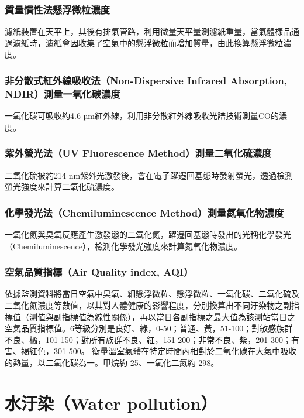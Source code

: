 \documentclass[a4paper,12pt]{report}
\begin{document}
\begin{itemize}
\subsubsection{質量慣性法懸浮微粒濃度}
濾紙裝置在天平上，其後有排氣管路，利用微量天平量測濾紙重量，當氣體樣品通過濾紙時，濾紙會因收集了空氣中的懸浮微粒而增加質量，由此換算懸浮微粒濃度。
\subsubsection{非分散式紅外線吸收法（Non-Dispersive Infrared Absorption, NDIR）測量一氧化碳濃度}
一氧化碳可吸收約4.6 µm紅外線，利用非分散紅外線吸收光譜技術測量CO的濃度。
\subsubsection{紫外螢光法（UV Fluorescence Method）測量二氧化硫濃度}
二氧化硫被約214 nm紫外光激發後，會在電子躍遷回基態時發射螢光，透過檢測螢光強度來計算二氧化硫濃度。
\subsubsection{化學發光法（Chemiluminescence Method）測量氮氧化物濃度}
一氧化氮與臭氧反應產生激發態的二氧化氮，躍遷回基態時發出的光稱化學發光（Chemiluminescence），檢測化學發光強度來計算氮氧化物濃度。
\subsubsection{空氣品質指標（Air Quality index, AQI）}
依據監測資料將當日空氣中臭氧、細懸浮微粒、懸浮微粒、一氧化碳、二氧化硫及二氧化氮濃度等數值，以其對人體健康的影響程度，分別換算出不同汙染物之副指標值（測值與副指標值為線性關係），再以當日各副指標之最大值為該測站當日之空氣品質指標值。6等級分別是良好、綠，0-50；普通、黃，51-100；對敏感族群不良、橘，101-150；對所有族群不良、紅，151-200；非常不良、紫，201-300；有害、褐紅色，301-500。
衡量溫室氣體在特定時間內相對於二氧化碳在大氣中吸收的熱量，以二氧化碳為一。甲烷約 25、一氧化二氮約 298。


\section{水汙染（Water pollution）}

\end{itemize}
\end{document}

